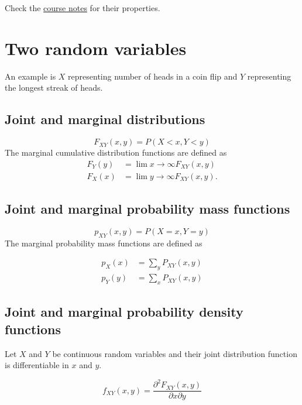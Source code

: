 \documentclass{article}
\begin{document}
    Check the \href{https://rateldajer.github.io/ECE493T25S19/preliminaries/probabilityreview/}{course notes} for their properties.

\section{Two random variables}
    An example is $X$ representing number of heads in a coin flip and $Y$ representing the longest streak of heads.
    \subsection{Joint and marginal distributions}
    \begin{equation}
        F_{XY}(x,y) = P(X<x, Y<y)
    \end{equation}
    The marginal cumulative distribution functions are defined as
    \begin{align}
        F_Y(y) & = \lim{x \to \infty}F_{XY}(x,y) \\ 
        F_X(x) & = \lim{y \to \infty}F_{XY}(x,y).
    \end{align}

    \subsection{Joint and marginal probability mass functions}
    \begin{equation}
        p_{XY}(x,y) = P(X=x, Y=y)        
    \end{equation}
    The marginal probability mass functions are defined as 
    
    \begin{align}
        p_{X}(x) & = \sum_y P_{XY}(x,y) \\   
        p_{Y}(y) & = \sum_x P_{XY}(x,y)     
    \end{align}

    \subsection{Joint and marginal probability density functions}
    Let $X$ and $Y$ be continuous random variables and their joint distribution function is differentiable in $x$ and $y$.

    \begin{equation}
        f_{XY}(x,y)=\frac{\partial^2 F_{XY}(x,y)}{\partial x \partial y}
    \end{equation}
\end{document}
